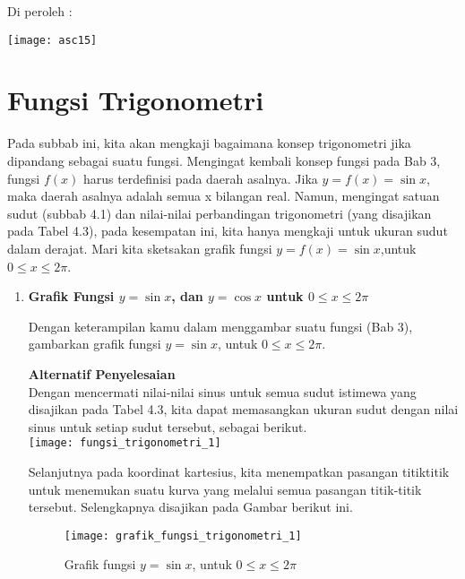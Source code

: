 \documentclass[11pt,fleqn]{book} %
\begin{document}
\begin{myEnumerate}
\begin{itemize}
\noindent Di peroleh : 

\noindent \texttt{[image: asc15]}

\noindent 

\section{Fungsi Trigonometri}

Pada subbab ini, kita akan  mengkaji bagaimana konsep trigonometri jika dipandang sebagai suatu fungsi. Mengingat kembali konsep fungsi pada Bab 3, fungsi $f(x)$ harus terdefinisi pada daerah asalnya. Jika $y = f(x) = \sin x$, maka daerah asalnya adalah semua x bilangan real. Namun, mengingat satuan sudut  (subbab 4.1) dan nilai-nilai perbandingan trigonometri (yang disajikan pada Tabel 4.3),  pada kesempatan ini, kita hanya mengkaji  untuk  ukuran sudut dalam derajat. Mari kita sketsakan grafik fungsi $y = f(x) = \sin x$,untuk $0 \leq x\leq 2\pi$.\\

\begin{enumerate}
\item \textbf{Grafik Fungsi $y = \sin x$, dan $y = \cos x$ untuk $0 \leq x\leq 2\pi$}\\
\begin{problem}
Dengan keterampilan kamu dalam menggambar suatu fungsi (Bab 3), gambarkan grafik fungsi $y = \sin x$, untuk $0 \leq x\leq 2\pi$.\\
\end{problem}
\textbf{Alternatif Penyelesaian}\\
Dengan mencermati nilai-nilai sinus untuk semua sudut istimewa yang disajikan pada Tabel 4.3, kita dapat memasangkan ukuran sudut dengan nilai sinus untuk setiap sudut tersebut, sebagai berikut.\\

\texttt{[image: fungsi\_trigonometri\_1]}

Selanjutnya pada koordinat kartesius, kita menempatkan pasangan titiktitik untuk menemukan suatu kurva  yang melalui semua pasangan titik-titik tersebut. Selengkapnya disajikan pada Gambar berikut ini.\\

\begin{figure}[!ht]
\begin{center}
\texttt{[image: grafik\_fungsi\_trigonometri\_1]}
\caption{Grafik fungsi $y = \sin x$, untuk $0 \leq x\leq 2\pi$}
\end{center}
\end{figure}


\end{enumerate}
\end{itemize}
\end{myEnumerate}
\end{document}
